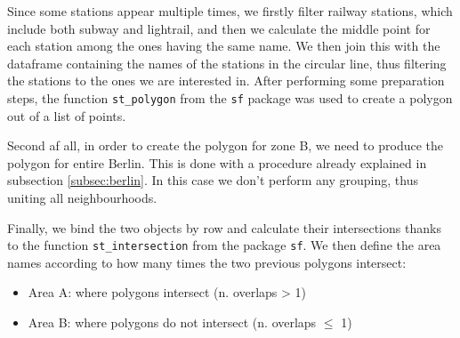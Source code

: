 

Since some stations appear multiple times, we firstly filter railway stations, which include both subway and lightrail, and then we calculate the middle point for each station among the ones having the same name. We then join this with the dataframe containing the names of the stations in the circular line, thus filtering the stations to the ones we are interested in. After performing some preparation steps, the function \texttt{st\_polygon} from the \texttt{sf} package was used to create a polygon out of a list of points.



Second af all, in order to create the polygon for zone B, we need to produce the  polygon for entire Berlin. This is done with a procedure already explained in subsection \ref{subsec:berlin}. In this case we don't perform any grouping, thus uniting all neighbourhoods.



Finally, we bind the two objects by row and calculate their intersections thanks to the function \texttt{st\_intersection} from the package \texttt{sf}. We then define the area names according to how many times the two previous polygons intersect:
	\begin{itemize}
    		\item Area A: where polygons intersect (n. overlaps > 1)
    		\item Area B: where polygons do not intersect (n. overlaps $\leq$ 1)
    \end{itemize}



